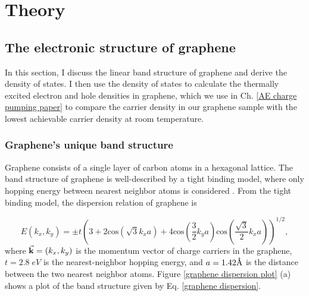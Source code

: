 \documentclass[double,12pt,1in]{beavtex}
\begin{document}
\chapter{Theory}

\section{The electronic structure of graphene}
In this section, I discuss the linear band structure of graphene and derive the density of states. I then use the density of states to calculate the thermally excited electron and hole densities in graphene, which we use in Ch. \ref{AE charge pumping paper} to compare the carrier density in our graphene sample with the lowest achievable carrier density at room temperature.

\subsection{Graphene's unique band structure}

Graphene consists of a single layer of carbon atoms in a hexagonal lattice. The band structure of graphene is well-described by a tight binding model, where only hopping energy between nearest neighbor atoms is considered \cite{wallace_band_1947}. From the tight binding model, the dispersion relation of graphene is 

\begin{equation}
    E(k_x, k_y) = \pm t  \left(3 + 2\mathrm{cos}(\sqrt{3}k_x a) + 4\mathrm{cos}(\frac{3}{2}k_y a)\mathrm{cos}(\frac{\sqrt{3}}{2}k_x a)\right)^{1/2}, \label{graphene dispersion}
\end{equation}
where $\vectorarrow{k} = (k_x, k_y)$ is the momentum vector of charge carriers in the graphene, $t = 2.8 \; eV$ is the nearest-neighbor hopping energy, and $a = 1.42 \SIUnitSymbolAngstrom$ is the distance between the two nearest neighbor atoms. Figure \ref{graphene dispersion plot} (a) shows a plot of the band structure given by Eq. \ref{graphene dispersion}.
\end{document}
